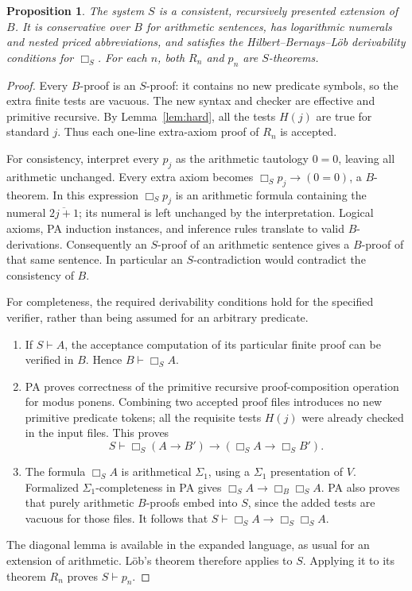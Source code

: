 \documentclass[11pt]{article}
\newtheorem{proposition}[theorem]{Proposition}
\theoremstyle{remark}
\newcommand{\num}[1]{\overline{#1}}
\begin{document}
\begin{proposition}\label{prop:S}
The system $S$ is a consistent, recursively presented extension of $B$.
It is conservative over $B$ for arithmetic sentences, has logarithmic
numerals and nested priced abbreviations, and satisfies the
Hilbert--Bernays--L\"ob derivability conditions for $\Box_S$.
For each $n$, both $R_n$ and $p_n$ are $S$-theorems.
\end{proposition}
\begin{proof}
Every $B$-proof is an $S$-proof: it contains no new predicate symbols,
so the extra finite tests are vacuous. The new syntax and checker are
effective and primitive recursive. By Lemma~\ref{lem:hard}, all the tests
$H(j)$ are true for standard $j$. Thus each one-line extra-axiom proof
of $R_n$ is accepted.

For consistency, interpret every $p_j$ as the arithmetic tautology $0=0$,
leaving all arithmetic unchanged. Every extra axiom becomes
$\Box_Sp_j\to(0=0)$, a $B$-theorem. In this expression $\Box_Sp_j$ is
an arithmetic formula containing the numeral $\num{2j+1}$; its numeral
is left unchanged by the interpretation. Logical axioms, PA induction
instances, and inference rules translate to valid $B$-derivations.
Consequently an $S$-proof of an arithmetic sentence gives a $B$-proof of
that same sentence. In particular an $S$-contradiction would contradict
the consistency of $B$.

For completeness, the required derivability conditions hold for the
specified verifier, rather than being assumed for an arbitrary predicate.
\begin{enumerate}
\item If $S\vdash A$, the acceptance computation of its particular finite
proof can be verified in $B$. Hence $B\vdash\Box_S A$.
\item PA proves correctness of the primitive recursive proof-composition
operation for modus ponens. Combining two accepted proof files introduces
no new primitive predicate tokens; all the requisite tests $H(j)$ were
already checked in the input files. This proves
\[
 S\vdash\Box_S(A\to B')\to(\Box_S A\to\Box_S B').
\]
\item The formula $\Box_S A$ is arithmetical $\Sigma_1$, using a
$\Sigma_1$ presentation of $V$. Formalized $\Sigma_1$-completeness in PA
gives $\Box_S A\to\Box_B\Box_S A$. PA also proves that purely arithmetic
$B$-proofs embed into $S$, since the added tests are vacuous for those files.
It follows that $S\vdash\Box_S A\to\Box_S\Box_S A$.
\end{enumerate}
The diagonal lemma is available in the expanded language, as usual for an
extension of arithmetic. L\"ob's theorem therefore applies to $S$. Applying
it to its theorem $R_n$ proves $S\vdash p_n$.
\end{proof}
\end{document}
